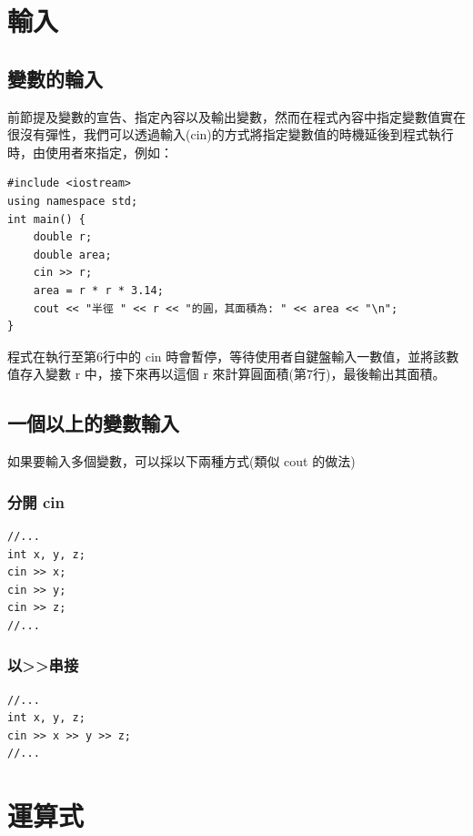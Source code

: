 \documentclass[12pt,a4paper]{article}
\begin{document}
\section{輸入}
\label{cpp_input}
\subsection{變數的輪入}
\label{sec:org9c38ac1}
前節提及變數的宣告、指定內容以及輸出變數，然而在程式內容中指定變數值實在很沒有彈性，我們可以透過輸入(cin)的方式將指定變數值的時機延後到程式執行時，由使用者來指定，例如：

\lstset{breaklines=true,language=cpp,label= ,caption= ,captionpos=b,firstnumber=1,numbers=left}
\begin{lstlisting}
#include <iostream>
using namespace std;
int main() {
    double r;
    double area;
    cin >> r;
    area = r * r * 3.14;
    cout << "半徑 " << r << "的圓，其面積為: " << area << "\n";
}
\end{lstlisting}

程式在執行至第6行中的 cin 時會暫停，等待使用者自鍵盤輸入一數值，並將該數值存入變數 r 中，接下來再以這個 r 來計算圓面積(第7行)，最後輸出其面積。

\subsection{一個以上的變數輸入}
\label{sec:orgb7f3fd5}
如果要輸入多個變數，可以採以下兩種方式(類似 cout 的做法)
\subsubsection{分開 cin}
\label{sec:org5663205}
\lstset{breaklines=true,language=cpp,label= ,caption= ,captionpos=b,firstnumber=1,numbers=left}
\begin{lstlisting}
//...
int x, y, z;
cin >> x;
cin >> y;
cin >> z;
//...
\end{lstlisting}

\subsubsection{以>>串接}
\label{sec:orgbea621d}
\lstset{breaklines=true,language=cpp,label= ,caption= ,captionpos=b,firstnumber=1,numbers=left}
\begin{lstlisting}
//...
int x, y, z;
cin >> x >> y >> z;
//...
\end{lstlisting}

\section{運算式}
\label{cpp_operation}
\end{document}
